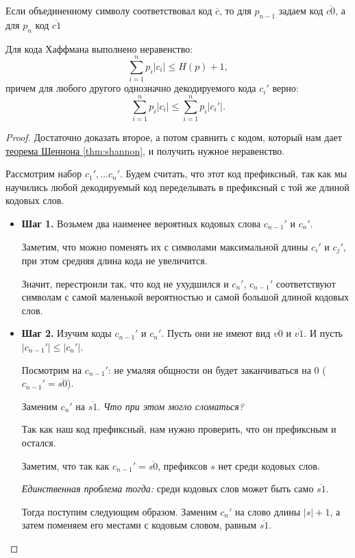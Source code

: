Если объединенному символу соответствовал код  $\overline{c}$, то для $ p_{n-1}$ задаем код  $\overline{c 0}$, а для $ p_n$ код  $ \overline{c 1}$
 
\begin{thm}
Для кода Хаффмана выполнено неравенство:
$$ \sum_{i=1}^{n} p_i \lvert c_i \rvert \le H(p) + 1,$$ 
причем для любого другого однозначно декодируемого кода $c_i'$ верно: 
$$ \sum_{i=1}^{n} p_i \lvert c_i \rvert  \le \sum_{i=1}^{n} p_i \lvert c_i' \rvert .$$
\end{thm}
\begin{proof}
	Достаточно доказать второе, а потом сравнить с кодом, который нам дает \hyperref[thm:shannon]{теорема Шеннона \ref{thm:shannon}}, и получить нужное неравенство.

Рассмотрим набор $  c_1', \ldots c_n'$.
Будем считать, что этот код префиксный, так как мы научились любой декодируемый код переделывать в префиксный с той же длиной кодовых слов. 

\begin{itemize}
	\item \textbf{Шаг 1.} Возьмем два наименее вероятных кодовых слова $ c_{n-1}'$ и $ c_n'$. 

		Заметим, что можно поменять их с символами максимальной длины  $ c_i'$ и $ c_j'$, при этом средняя длина кода не увеличится. 

		Значит, перестроили так, что код не ухудшился и $c_n'$, $c_{n-1}'$ соответствуют символам с самой маленькой вероятностью и самой большой длиной кодовых слов.
    
	\item \textbf{Шаг 2.} Изучим коды $ c_{n-1}'$ и $ c_n'$.
		Пусть они не имеют вид $ \overline{v 0}$ и $ \overline{v 1}$. И пусть $ \lvert c_{n-1}' \rvert  \le  \lvert c_n' \rvert $.

		Посмотрим на $ c_{n-1}'$: не умаляя общности он будет заканчиваться на $ 0$ ($c_{n-1}'= \overline{s 0}$). 

		Заменим $ c_n'$ на $ \overline{s 1}$. \textit{Что при этом могло сломаться?}

		Так как наш код префиксный, нам нужно проверить, что он префиксным и остался.

		Заметим, что так как $c_{n-1}' = \overline{s 0}$, префиксов $s$ нет среди кодовых слов. 

		\textit{Единственная проблема тогда:} среди кодовых слов может быть само $\overline{s 1}$.

		Тогда поступим следующим образом. 
		Заменим $c_n'$ на слово длины $\lvert s \rvert +1$, а затем поменяем его местами с кодовым словом, равным $\overline{s1}$. 


\end{itemize}
\end{proof}
